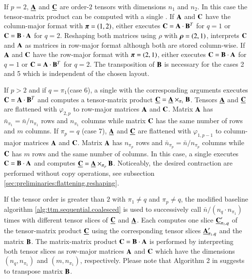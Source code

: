 If $p=2$, $\underline{\mathbf{A}}$ and $\underline{\mathbf{C}}$ are order-$2$ tensors with dimensions $n_1$ and $n_2$.
In this case the tensor-matrix product can be computed with a single .
If $\mathbf{A}$ and $\mathbf{C}$ have the column-major format with $\boldsymbol{\pi}=(1,2)$,  either executes $\mathbf{C} = \mathbf{A} \cdot \mathbf{B}^T$ for $q =1$ or $\mathbf{C} = \mathbf{B} \cdot \mathbf{A}$ for $q=2$.
Reshaping both matrices using $\rho$ with $\boldsymbol{\rho} = (2,1)$,  interprets $\mathbf{C}$ and $\mathbf{A}$ as matrices in row-major format although both are stored column-wise.
If $\mathbf{A}$ and $\mathbf{C}$ have the row-major format with $\boldsymbol{\pi}=(2,1)$,  either executes $\mathbf{C} = \mathbf{B} \cdot \mathbf{A}$ for $q =1$ or $\mathbf{C} = \mathbf{A} \cdot \mathbf{B}^T$ for $q=2$. 
The transposition of $\mathbf{B}$ is necessary for the cases 2 and 5 which is independent of the chosen layout.

If $p>2$ and if $q=\pi_1$(case 6), a single  with the corresponding arguments executes $\mathbf{C} = \mathbf{A} \cdot \mathbf{B}^T$ and computes a tensor-matrix product $\underline{\mathbf{C}} = \underline{\mathbf{A}} \times_{\pi_1} \mathbf{B}$.
Tensors $\underline{\mathbf{A}}$ and $\underline{\mathbf{C}}$ are flattened with $\varphi_{2,p}$ to row-major matrices $\mathbf{A}$ and $\mathbf{C}$.
Matrix $\mathbf{A}$ has $\bar{n}_{\pi_1} = \bar{n} / n_{\pi_1}$ rows and $n_{\pi_1}$ columns while matrix $\mathbf{C}$ has the same number of rows and $m$ columns.
If $\pi_p=q$ (case 7), $\underline{\mathbf{A}}$ and $\underline{\mathbf{C}}$ are flattened with $\varphi_{1,p-1}$ to column-major matrices $\mathbf{A}$ and $\mathbf{C}$.
Matrix $\mathbf{A}$ has $n_{\pi_p}$ rows and $\bar{n}_{\pi_p} =  \bar{n} / n_{\pi_p}$ columns while $\mathbf{C}$ has $m$ rows and the same number of columns.
In this case, a single  executes $\mathbf{C} = \mathbf{B} \cdot \mathbf{A}$ and computes $\underline{\mathbf{C}} = \underline{\mathbf{A}} \times_{\pi_p} \mathbf{B}$.
Noticeably, the desired contraction are performed without copy operations, see subsection \ref{sec:preliminaries:flattening.reshaping}.

If the tensor order is greater than $2$ with $\pi_1\neq q$ and $\pi_p \neq q$, the modified baseline algorithm \ref{alg:ttm.sequential.coalesced} is used to successively call $\bar{n} / (n_q \cdot n_{\pi_1})$ times  with different tensor slices of $\underline{\mathbf{C}}$ and $\underline{\mathbf{A}}$.
Each  computes one slice $\underline{\mathbf{C}}_{\pi_1,q}'$ of the tensor-matrix product $\underline{\mathbf{C}}$ using the corresponding tensor slices $\underline{\mathbf{A}}_{\pi_1,q}'$ and the matrix $\mathbf{B}$.
The matrix-matrix product $\mathbf{C} = \mathbf{B} \cdot \mathbf{A}$ is performed by interpreting both tensor slices as row-major matrices $\mathbf{A}$ and $\mathbf{C}$ which have the dimensions $(n_q,n_{\pi_1})$ and $(m,n_{\pi_1})$, respectively.
Please note that Algorithm 2 in \cite{li:2015:input} suggests to transpose matrix $\mathbf{B}$.

